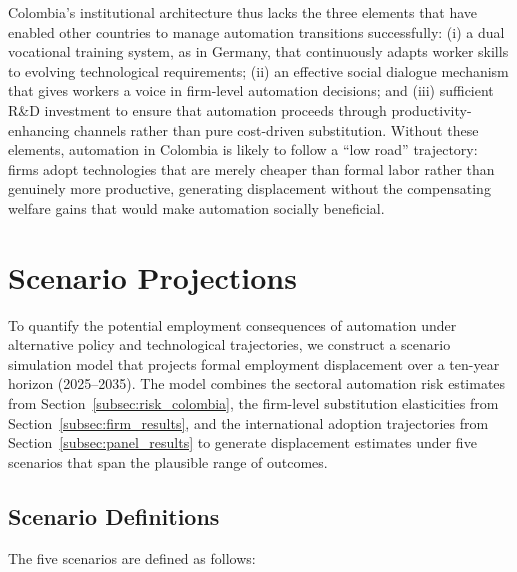 Colombia's institutional architecture thus lacks the three elements that have enabled other countries to manage automation transitions successfully: (i) a dual vocational training system, as in Germany, that continuously adapts worker skills to evolving technological requirements; (ii) an effective social dialogue mechanism that gives workers a voice in firm-level automation decisions; and (iii) sufficient R\&D investment to ensure that automation proceeds through productivity-enhancing channels rather than pure cost-driven substitution. Without these elements, automation in Colombia is likely to follow a ``low road'' trajectory: firms adopt technologies that are merely cheaper than formal labor rather than genuinely more productive, generating displacement without the compensating welfare gains that would make automation socially beneficial.


\section{Scenario Projections}
\label{sec:scenarios}

To quantify the potential employment consequences of automation under alternative policy and technological trajectories, we construct a scenario simulation model that projects formal employment displacement over a ten-year horizon (2025--2035). The model combines the sectoral automation risk estimates from Section~\ref{subsec:risk_colombia}, the firm-level substitution elasticities from Section~\ref{subsec:firm_results}, and the international adoption trajectories from Section~\ref{subsec:panel_results} to generate displacement estimates under five scenarios that span the plausible range of outcomes.

\subsection{Scenario Definitions}
\label{subsec:scenario_definitions}

The five scenarios are defined as follows:

